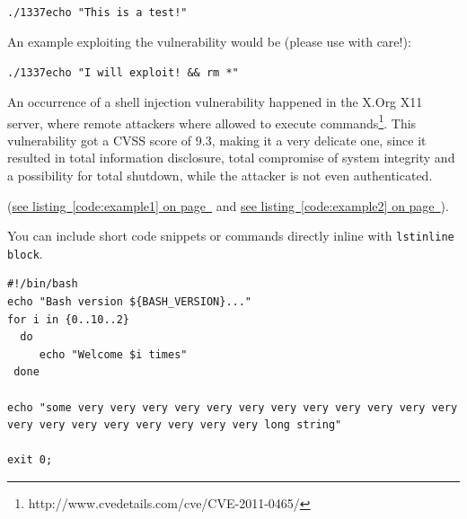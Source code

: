 \documentclass[12pt,a4paper,titlepage,oneside]{scrartcl}
\begin{document}
\lstinline{./1337echo "This is a test!"}

An example exploiting the vulnerability would be (please use with care!):

\lstinline{./1337echo "I will exploit! && rm *"}

An occurrence of a shell injection vulnerability happened in the X.Org X11 server, where remote attackers where allowed to execute commands\footnote{http://www.cvedetails.com/cve/CVE-2011-0465/}. This vulnerability got a CVSS score of 9.3, making it a very delicate one, since it resulted in total information disclosure, total compromise of system integrity and a possibility for total shutdown, while the attacker is not even authenticated.

(\hyperref[code:example1]{see listing~\ref*{code:example1} on page~\pageref*{code:example1}} and \hyperref[code:example2]{see listing~\ref*{code:example2} on page~\pageref*{code:example2}}).

You can include short code snippets or commands directly inline with \lstinline{lstinline block}.

%

\begin{lstlisting}[caption=Example bash script,label=code:example2,style=simple]
#!/bin/bash
echo "Bash version ${BASH_VERSION}..."
for i in {0..10..2}
  do
     echo "Welcome $i times"
 done

echo "some very very very very very very very very very very very very very very very very very very very very long string"

exit 0;
\end{lstlisting}


%
%
\end{document}
